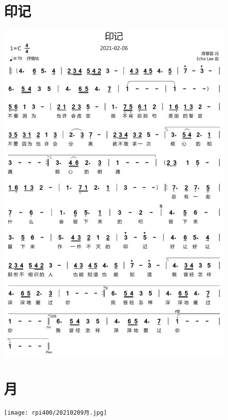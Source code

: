 \documentclass[cn,pad,twocol]{elegantbook}
\begin{document}
\section{印记} \includegraphics[width=0.9\textwidth]{rpi400/20210206印记.jpg}
\section{月}\texttt{[image: rpi400/20210209月.jpg]}
\end{document}
